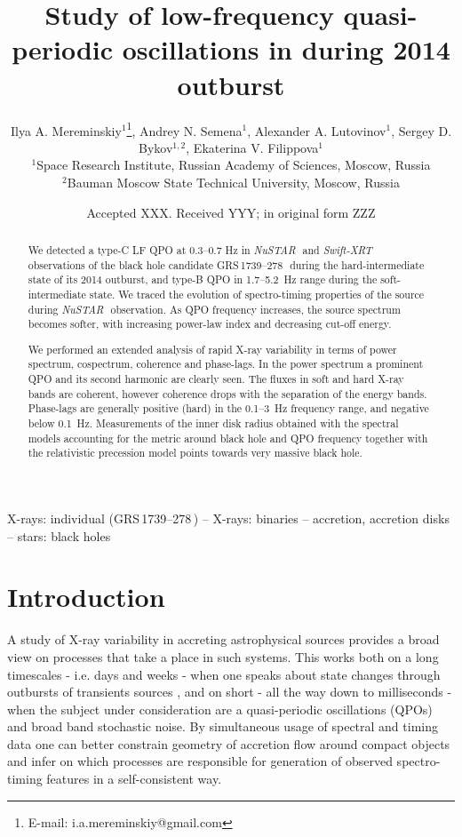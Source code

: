 \documentclass[a4paper,fleqn,usenatbib]{mnras}
\title[Study of low-frequency QPO in  \grs]{Study of low-frequency quasi-periodic oscillations in \grs during 2014 outburst}
\author[I. A. Mereminskiy et al.]{
Ilya A. Mereminskiy$^{1}$\thanks{E-mail: i.a.mereminskiy@gmail.com},
Andrey N. Semena$^{1}$,
Alexander A. Lutovinov$^{1}$,\newauthor
Sergey D. Bykov$^{1,2}$,
Ekaterina V. Filippova$^{1}$
\\
$^{1}$Space Research Institute, Russian Academy of Sciences, Moscow, Russia\\
$^{2}$Bauman Moscow State Technical University, Moscow, Russia\\
}
\date{Accepted XXX. Received YYY; in original form ZZZ}
\def\grs{{GRS\,1739--278\,}}
\def\swiftx{{\em Swift-XRT\,}}
\def\nustar{{\em NuSTAR\,}}
\begin{document}
\label{firstpage}
\pagerange{\pageref{firstpage}--\pageref{lastpage}}
\maketitle

\begin{abstract}
We detected a type-C LF QPO at 0.3--0.7 Hz in \nustar\, and \swiftx\, observations of the black hole candidate \grs\, during the hard-intermediate state of its 2014 outburst, and type-B QPO in 1.7--5.2~Hz range during the soft-intermediate state. We traced the evolution of spectro-timing properties of the source during \nustar\, observation. 
As QPO frequency increases, the source spectrum becomes softer, with increasing power-law index and decreasing cut-off energy.

We performed an extended analysis of rapid X-ray variability in terms of power spectrum, cospectrum, coherence and phase-lags. 
In the power spectrum a prominent QPO and its second harmonic are clearly seen. 
The fluxes in soft and hard X-ray bands are coherent, however coherence drops with the separation of the energy bands. 
Phase-lags are generally positive (hard) in the 0.1--3~Hz frequency range, and negative below 0.1~Hz.
Measurements of the inner disk radius obtained with the spectral models accounting for the metric around black hole and QPO frequency together with the relativistic precession model points towards very massive black hole.
\end{abstract}

\begin{keywords}
X-rays: individual (\grs) -- X-rays: binaries -- accretion, accretion disks  -- stars: black holes
\end{keywords}


\section{Introduction}
\label{sec:intro} 
A study of X-ray variability in accreting astrophysical sources provides a broad view on processes that take a place in such systems. 
This works both on a long timescales - i.e. days and weeks - when one speaks about state changes through outbursts of transients sources \citep[see e.g.][]{homan05, heil15}, and on short - all the way down to milliseconds - when the subject under consideration are a quasi-periodic oscillations (QPOs) and broad band stochastic noise. 
By simultaneous usage of spectral and timing data one can better constrain geometry of accretion flow around compact objects and infer on which processes are responsible for generation of observed spectro-timing features in a self-consistent way.
\end{document}
